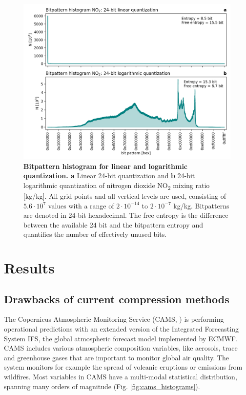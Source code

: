 \begin{figure}[tbhp]
	\includegraphics[width=1\textwidth]{Figures/compression/bitpattern_hist.png}
	\caption{\textbf{Bitpattern histogram for linear and logarithmic quantization. a}
	Linear 24-bit quantization and \textbf{b} 24-bit logarithmic quantization of nitrogen dioxide NO\textsubscript{2} mixing ratio [kg/kg].
	All grid points and all vertical levels are used, consisting of $5.6 \cdot 10^7$ values with a range of $2 \cdot 10^{-14}$ to
	$2 \cdot 10^{-7}$ kg/kg. Bitpatterns are denoted in 24-bit hexadecimal. The free entropy is the difference between the
	available 24 bit and the bitpattern entropy and quantifies the number of effectively unused bits.}
	\label{fig:compression_bitpattern_hist}
\end{figure}

\section{Results}
\label{sec:compression_results}
\subsection{Drawbacks of current compression methods}

The Copernicus Atmospheric Monitoring Service (CAMS, \cite{Inness2019}) is performing operational predictions with an extended
version of the Integrated Forecasting System IFS, the global atmospheric forecast model implemented by ECMWF.
CAMS includes various atmospheric composition variables, like aerosols, trace and greenhouse gases that are
important to monitor global air quality. The system monitors for example the spread of volcanic eruptions or
emissions from wildfires. Most variables in CAMS have a multi-modal statistical distribution, spanning many
orders of magnitude (Fig. \ref{fig:cams_histograms}).

